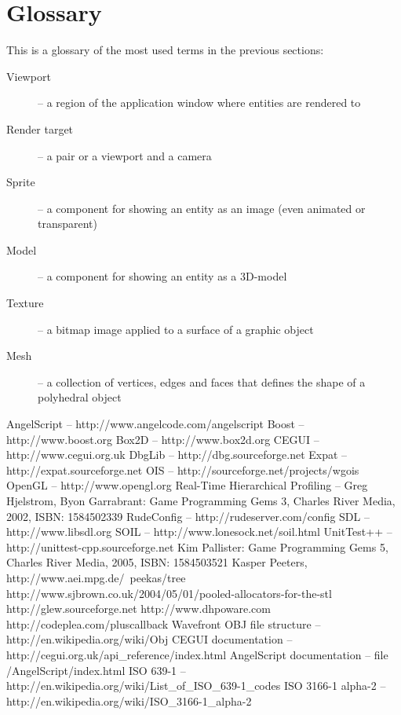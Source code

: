 \documentclass[a4paper, 12pt]{report}
\begin{document}
\section{Glossary}
This is a glossary of the most used terms in the previous sections:

\begin{description}
  \item[Viewport] -- a region of the application window where entities are rendered to
  \item[Render target] -- a pair or a viewport and a camera
  \item[Sprite] -- a component for showing an entity as an image (even animated or transparent)
  \item[Model] -- a component for showing an entity as a 3D-model
  \item[Texture] -- a bitmap image applied to a surface of a graphic object
  \item[Mesh] -- a collection of vertices, edges and faces that defines the shape of a polyhedral object
\end{description}




\begin{thebibliography}{9}
AngelScript -- http://www.angelcode.com/angelscript
Boost -- http://www.boost.org
Box2D -- http://www.box2d.org
CEGUI -- http://www.cegui.org.uk
DbgLib -- http://dbg.sourceforge.net
Expat -- http://expat.sourceforge.net
OIS -- http://sourceforge.net/projects/wgois
OpenGL -- http://www.opengl.org
Real-Time Hierarchical Profiling -- Greg Hjelstrom, Byon Garrabrant: Game Programming Gems 3, Charles River Media, 2002, ISBN: 1584502339
RudeConfig -- http://rudeserver.com/config
SDL -- http://www.libsdl.org
SOIL -- http://www.lonesock.net/soil.html
UnitTest++ -- http://unittest-cpp.sourceforge.net
Kim Pallister: Game Programming Gems 5, Charles River Media, 2005, ISBN: 1584503521
Kasper Peeters, http://www.aei.mpg.de/~peekas/tree
http://www.sjbrown.co.uk/2004/05/01/pooled-allocators-for-the-stl
http://glew.sourceforge.net
http://www.dhpoware.com
http://codeplea.com/pluscallback
Wavefront OBJ file structure -- http://en.wikipedia.org/wiki/Obj
CEGUI documentation -- http://cegui.org.uk/api\_reference/index.html
AngelScript documentation -- file /AngelScript/index.html
ISO 639-1 -- http://en.wikipedia.org/wiki/List\_of\_ISO\_639-1\_codes
ISO 3166-1 alpha-2 -- http://en.wikipedia.org/wiki/ISO\_3166-1\_alpha-2
\end{thebibliography}

\clearpage
{}
\listoffigures

\clearpage
{}
\listoftables
\end{document}
